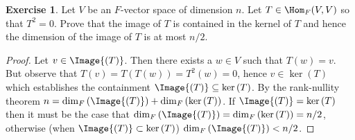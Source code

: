 \documentclass[10pt,twoside,openany]{memoir}
\theoremstyle{plain}
\theoremstyle{definition}
\newtheorem{exercise}{Exercise}
\theoremstyle{remark}
\numberwithin{equation}{section}
\renewcommand{\geq}{\geqslant}
\newcommand{\textui}[1]{\uline{\textit{#1}}}
\begin{document}
    \addtocounter{exercise}{4}
    \vspace{10pt}
    \begin{exercise}
        Let $V$ be an $F$-vector space of dimension $n$. Let $T \in \Hom_F{(V,V)}$ so that $T^2 = 0$. Prove that the image of $T$ is contained in the kernel of $T$ and hence the dimension of the image of $T$ is at most $n/2$.
    \end{exercise}
        \begin{proof}
            Let $v \in \Image{(T)}$. Then there exists a $w \in V$ such that $T(w) = v$. But observe that $T(v) = T(T(w)) = T^2(w) = 0$, hence $v \in \ker{(T)}$ which establishes the containment $\Image{(T)} \subseteq \ker{(T)}$. By the rank-nullity theorem $n = \dim_F{(\Image{(T)})} + \dim_F{(\ker{(T)})}$. If $\Image{(T)} = \ker{(T)}$ then it must be the case that $\dim_F{(\Image{(T)})} = \dim_F{(\ker{(T)})} = n/2$, otherwise (when $\Image{(T)} \subset \ker{(T)}$) $\dim_F{(\Image{(T)})} < n/2$.
        \end{proof}
    \begin{comment}
    \begin{exercise}
        Let $T \in \Hom_F{(V,V)}$.
            \begin{enumerate}[label = (\alph*)]
                \item Give an example to show that one does not always have $V \cong \ker{(T)} \oplus \Image{(T)}$.
                \item Show that $\ker{(T^j)} \subset \ker{(T^{j+1})}$ for all $j \geq 1$. Prove that this sequence stabilizes; i.e., there exists $m \geq 1$ so that $\ker{(T^{m+j})} = \ker{(T^m)}$ for all $j \geq 1$. The subspace $\ker{(T^m)}$ is called the \textui{eventual kernel} and denoted $\ker{(T^\infty)}$.
                \item Show that $\Image{(T^{j})} \supset \Image{(T^{j+1})}$ for all $j \geq 1$. Prove that this sequence stabilizes; i.e., there exists $m \geq 1$ so that $\Image{(T^{m+j})} = \Image{(T^{m})}$ for all $j \geq 1$. The subspace $\Image{(T^{m})}$ is called the \textui{eventual image} and denoted $\Image{(T^{\infty})}$.
                \item Prove that $V \cong \ker{(T^\infty)} \oplus \Image{(T^\infty)}$.
            \end{enumerate}
    \end{exercise}
    \end{comment}
\end{document}
